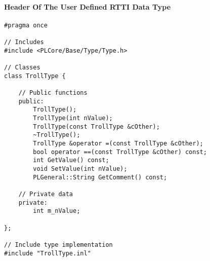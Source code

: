 \paragraph{Header Of The User Defined RTTI Data Type}
\begin{lstlisting}[label=Code:UserDefinedRTTIDataTypeHeader,caption={Header of the user defined RTTI data type}]
#pragma once

// Includes
#include <PLCore/Base/Type/Type.h>

// Classes
class TrollType {

	// Public functions
	public:
		TrollType();
		TrollType(int nValue);
		TrollType(const TrollType &cOther);
		~TrollType();
		TrollType &operator =(const TrollType &cOther);
		bool operator ==(const TrollType &cOther) const;
		int GetValue() const;
		void SetValue(int nValue);
		PLGeneral::String GetComment() const;

	// Private data
	private:
		int m_nValue;

};

// Include type implementation
#include "TrollType.inl"
\end{lstlisting}


